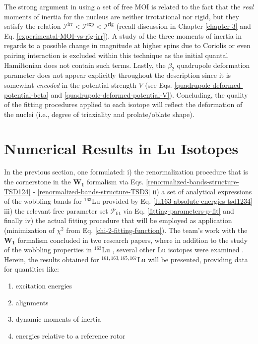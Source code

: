 The strong argument in using a set of free MOI is related to the fact that the \emph{real} moments of inertia for the nucleus are neither irrotational nor rigid, but they satisfy the relation $\mathcal{I}^\text{irr}<\mathcal{I}^\text{exp}<\mathcal{I}^\text{rig}$ (recall discussion in Chapter \ref{chapter-3} and Eq. \ref{experimental-MOI-vs-rig-irr}). A study of the three moments of inertia in regards to a possible change in magnitude at higher spins due to Coriolis or even pairing interaction is excluded within this technique as the initial quantal Hamiltonian does not contain such terms. Lastly, the $\beta_2$ quadrupole deformation parameter does not appear explicitly throughout the description since it is somewhat \emph{encoded} in the potential strength $V$ (see Eqs. \ref{quadrupole-deformed-potential-beta} and \ref{quadrupole-deformed-potential-V}). Concluding, the quality of the fitting procedures applied to each isotope will reflect the deformation of the nuclei (i.e., degree of triaxiality and prolate/oblate shape).

\section{Numerical Results in Lu Isotopes}

In the previous section, one formulated: i) the renormalization procedure that is the cornerstone in the $\mathbf{W_1}$ formalism via Eqs. \ref{renormalized-bands-structure-TSD124} - \ref{renormalized-bands-structure-TSD3} ii) a set of analytical expressions of the wobbling bands for $^{163}$Lu provided by Eq. \ref{lu163-absolute-energies-tsd1234} iii) the relevant free parameter set $\mathcal{P}_\text{fit}$ via Eq. \ref{fitting-parameters-p-fit} and finally iv) the actual fitting procedure that will be employed as application (minimization of $\chi^2$ from Eq. \ref{chi-2-fitting-function}). The team's work with the $\mathbf{W_1}$ formalism concluded in two research papers, where in addition to the study of the wobbling properties in $^{163}$Lu \cite{raduta2020towards}, several other Lu isotopes were examined \cite{raduta2020approach}. Herein, the results obtained for $^{161,163,165,167}$Lu will be presented, providing data for quantities like:
\begin{enumerate}
    \item excitation energies
    \item alignments
    \item dynamic moments of inertia
    \item energies relative to a reference rotor
\end{enumerate}

